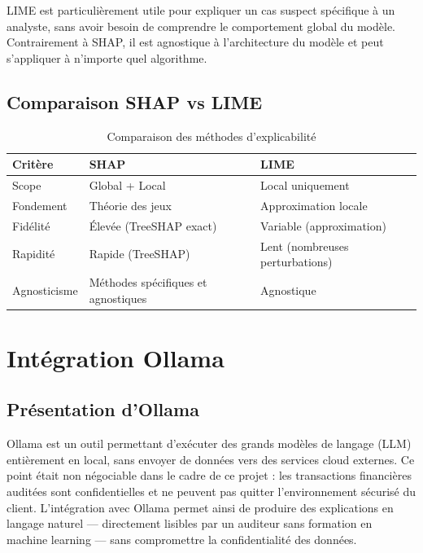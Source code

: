 \documentclass[12pt,a4paper,twoside]{report}
\begin{document}
LIME est particulièrement utile pour expliquer un cas suspect spécifique à un analyste, sans avoir besoin de comprendre le comportement global du modèle. Contrairement à SHAP, il est agnostique à l'architecture du modèle et peut s'appliquer à n'importe quel algorithme.

\subsection{Comparaison SHAP vs LIME}

\begin{table}[H]
\centering
\caption{Comparaison des méthodes d'explicabilité}
\label{tab:shap_lime}
\begin{tabular}{lll}
\toprule
\textbf{Critère} & \textbf{SHAP} & \textbf{LIME} \\
\midrule
Scope          & Global + Local & Local uniquement \\
Fondement      & Théorie des jeux & Approximation locale \\
Fidélité       & Élevée (TreeSHAP exact) & Variable (approximation) \\
Rapidité       & Rapide (TreeSHAP) & Lent (nombreuses perturbations) \\
Agnosticisme   & Méthodes spécifiques et agnostiques & Agnostique \\
\bottomrule
\end{tabular}
\end{table}

\section{Intégration Ollama}

\subsection{Présentation d'Ollama}

Ollama est un outil permettant d'exécuter des grands modèles de langage (LLM) entièrement en local, sans envoyer de données vers des services cloud externes. Ce point était non négociable dans le cadre de ce projet : les transactions financières auditées sont confidentielles et ne peuvent pas quitter l'environnement sécurisé du client. L'intégration avec Ollama permet ainsi de produire des explications en langage naturel --- directement lisibles par un auditeur sans formation en machine learning --- sans compromettre la confidentialité des données.
\end{document}
